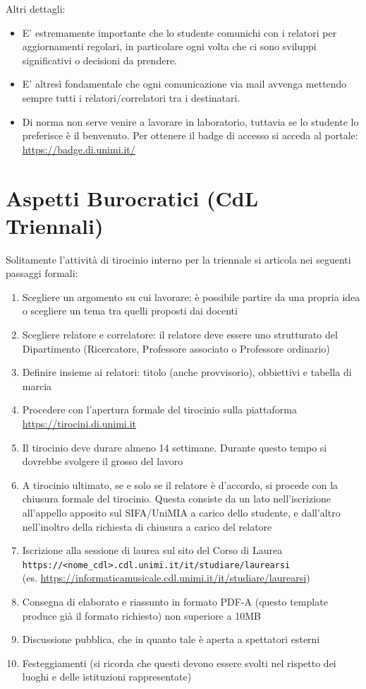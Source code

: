 \documentclass[12pt]{report}
\begin{document}
    Altri dettagli:
    \begin{itemize}
        \item E' estremamente importante che lo studente comunichi con i relatori per aggiornamenti regolari, in particolare ogni volta che ci sono sviluppi significativi o decisioni da prendere.
        \item E' altresì fondamentale che ogni comunicazione via mail avvenga mettendo sempre tutti i relatori/correlatori tra i destinatari.
        \item Di norma non serve venire a lavorare in laboratorio, tuttavia se lo studente lo preferisce è il benvenuto. Per ottenere il badge di accesso si acceda al portale: \url{https://badge.di.unimi.it/}
    \end{itemize}

    \section{Aspetti Burocratici (CdL Triennali)}
    Solitamente l'attività di tirocinio interno per la triennale si articola nei seguenti passaggi formali:
    \begin{enumerate}
        \item Scegliere un argomento su cui lavorare: è possibile partire da una propria idea o scegliere un tema tra quelli proposti dai docenti
        \item Scegliere relatore e correlatore: il relatore deve essere uno strutturato del Dipartimento (Ricercatore, Professore associato o Professore ordinario)
        \item Definire insieme ai relatori: titolo (anche provvisorio), obbiettivi e tabella di marcia
        \item Procedere con l'apertura formale del tirocinio sulla piattaforma\\ \url{https://tirocini.di.unimi.it}
        \item Il tirocinio deve durare almeno 14 settimane. Durante questo tempo si dovrebbe svolgere il grosso del lavoro
        \item A tirocinio ultimato, se e solo se il relatore è d'accordo, si procede con la chiusura formale del tirocinio. Questa consiste da un lato nell'iscrizione all'appello apposito sul SIFA/UniMIA a carico dello studente, e dall'altro nell'inoltro della richiesta di chiusura a carico del relatore
        \item Iscrizione alla sessione di laurea sul sito del Corso di Laurea\\ \texttt{https://<nome\_cdl>.cdl.unimi.it/it/studiare/laurearsi}\\ (es. \url{https://informaticamusicale.cdl.unimi.it/it/studiare/laurearsi})
        \item Consegna di elaborato e riassunto in formato PDF-A (questo template produce già il formato richiesto) non superiore a 10MB
        \item Discussione pubblica, che in quanto tale è aperta a spettatori esterni
        \item Festeggiamenti (si ricorda che questi devono essere svolti nel rispetto dei luoghi e delle istituzioni rappresentate)
    \end{enumerate}
\end{document}
